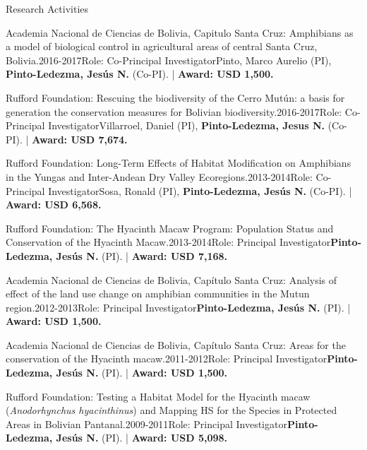 \documentclass{resume} %
\begin{document}
\begin{rSection}{Research Activities}
\begin{pSubsection}{Academia Nacional de Ciencias de Bolivia, Capitulo Santa Cruz: }{Amphibians as a model of biological control in agricultural areas of central Santa Cruz, Bolivia.}{2016-2017}{Role: Co-Principal Investigator}{Pinto, Marco Aurelio (PI), \textbf{Pinto-Ledezma, Jesús N.} (Co-PI). | {\bf Award: USD 1,500.}}
\end{pSubsection}

\begin{pSubsection}{Rufford Foundation: }{Rescuing the biodiversity of the Cerro Mutún: a basis for generation the conservation measures for Bolivian biodiversity.}{2016-2017}{Role: Co-Principal Investigator}{Villarroel, Daniel (PI), \textbf{Pinto-Ledezma, Jesus N.} (Co-PI). | {\bf Award: USD 7,674.}}
\end{pSubsection}

\begin{pSubsection}{Rufford Foundation: }{Long-Term Effects of Habitat Modification on Amphibians in the Yungas and Inter-Andean Dry Valley Ecoregions.}{2013-2014}{Role: Co-Principal Investigator}{Sosa, Ronald (PI), \textbf{Pinto-Ledezma, Jesús N.} (Co-PI). | {\bf Award: USD 6,568.}}
\end{pSubsection}

\begin{pSubsection}{Rufford Foundation: }{The Hyacinth Macaw Program: Population Status and Conservation of the Hyacinth Macaw.}{2013-2014}{Role: Principal Investigator}{\textbf{Pinto-Ledezma, Jesús N.} (PI). | {\bf Award: USD 7,168.}}
\end{pSubsection}

\begin{pSubsection}{Academia Nacional de Ciencias de Bolivia, Capítulo Santa Cruz: }{Analysis of effect of the land use change on amphibian communities in the Mutun region.}{2012-2013}{Role: Principal Investigator}{\textbf{Pinto-Ledezma, Jesús N.} (PI). | {\bf Award: USD 1,500.}}
\end{pSubsection}

\begin{pSubsection}{Academia Nacional de Ciencias de Bolivia, Capítulo Santa Cruz: }{Areas for the conservation of the Hyacinth macaw.}{2011-2012}{Role: Principal Investigator}{\textbf{Pinto-Ledezma, Jesús N.} (PI). | {\bf Award: USD 1,500.}}
\end{pSubsection}

\begin{pSubsection}{Rufford Foundation: }{Testing a Habitat Model for the Hyacinth macaw (\emph{Anodorhynchus hyacinthinus}) and Mapping HS for the Species in Protected Areas in Bolivian Pantanal.}{2009-2011}{Role: Principal Investigator}{\textbf{Pinto-Ledezma, Jesús N.} (PI). | {\bf Award: USD 5,098.}}
\end{pSubsection}

\end{rSection}
\end{document}
